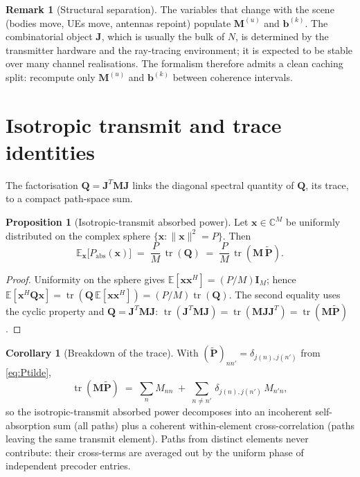 \documentclass[11pt,a4paper]{article}
\theoremstyle{definition}
\newtheorem{proposition}[proposition]{Proposition}
\newtheorem{corollary}[corollary]{Corollary}
\newtheorem{remark}[remark]{Remark}
\newcommand{\Complex}{\mathbb{C}}
\newcommand{\Jmat}{\mathbf{J}}                 %
\newcommand{\Mmat}{\mathbf{M}}                 %
\newcommand{\Qmat}{\mathbf{Q}}                 %
\newcommand{\Pmat}{\tilde{\mathbf{P}}}         %
\newcommand{\xx}{\mathbf{x}}
\newcommand{\bvec}{\mathbf{b}}
\newcommand{\Id}{\mathbf{I}}
\begin{document}
\begin{remark}[Structural separation]\label{rem:MU-sep}
The variables that change with the scene (bodies move, UEs move, antennas
repoint) populate $\Mmat^{(u)}$ and $\bvec^{(k)}$.  The combinatorial
object $\Jmat$, which is usually the bulk of $N$, is determined by the
transmitter hardware and the ray-tracing environment; it is expected to
be stable over many channel realisations.  The formalism therefore admits
a clean caching split: recompute only $\Mmat^{(u)}$ and $\bvec^{(k)}$
between coherence intervals.
\end{remark}

\section{Isotropic transmit and trace identities}\label{sec:trace}

The factorisation $\Qmat=\Jmat^T\Mmat\Jmat$ links the diagonal spectral
quantity of $\Qmat$, its trace, to a compact path-space sum.

\begin{proposition}[Isotropic-transmit absorbed power]\label{prop:iso}
Let $\xx\in\Complex^M$ be uniformly distributed on the complex sphere
$\{\xx:\|\xx\|^2=P\}$.  Then
\begin{equation}\label{eq:iso}
  \mathbb E_\xx\bigl[P_\mathrm{abs}(\xx)\bigr]
  \;=\;\frac{P}{M}\,\operatorname{tr}(\Qmat)
  \;=\;\frac{P}{M}\,\operatorname{tr}(\Mmat\,\Pmat).
\end{equation}
\end{proposition}

\begin{proof}
Uniformity on the sphere gives $\mathbb E[\xx\xx^H]=(P/M)\Id_M$; hence
$\mathbb E[\xx^H\Qmat\xx]=\operatorname{tr}(\Qmat\,\mathbb E[\xx\xx^H])
=(P/M)\operatorname{tr}(\Qmat)$.  The second equality uses the cyclic
property and $\Qmat=\Jmat^T\Mmat\Jmat$:
$\operatorname{tr}(\Jmat^T\Mmat\Jmat)
=\operatorname{tr}(\Mmat\Jmat\Jmat^T)=\operatorname{tr}(\Mmat\Pmat)$.
\end{proof}

\begin{corollary}[Breakdown of the trace]\label{cor:tr-structure}
With $(\Pmat)_{nn'}=\delta_{j(n),j(n')}$ from \eqref{eq:Ptilde},
\begin{equation}\label{eq:tr-breakdown}
  \operatorname{tr}(\Mmat\Pmat)
  \;=\;\sum_{n}M_{nn}
  \;+\;\sum_{n\ne n'}\,\delta_{j(n),j(n')}\,M_{n'n},
\end{equation}
so the isotropic-transmit absorbed power decomposes into an incoherent
self-absorption sum (all paths) plus a coherent within-element
cross-correlation (paths leaving the same transmit element).  Paths from
distinct elements never contribute: their cross-terms are averaged out by
the uniform phase of independent precoder entries.
\end{corollary}
\end{document}
